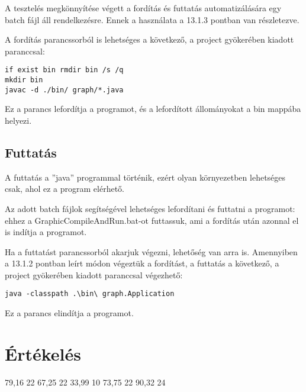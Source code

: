 A tesztelés megkönnyítése végett a fordítás és futtatás automatizálására egy batch fájl áll rendelkezésre. Ennek a használata a 13.1.3 pontban van részletezve. 

A fordítás parancssorból is lehetséges a következő, a project gyökerében kiadott paranccsal:

\begin{lstlisting}
if exist bin rmdir bin /s /q
mkdir bin
javac -d ./bin/ graph/*.java
\end{lstlisting}

Ez a parancs lefordítja a programot, és a lefordított állományokat a bin mappába helyezi.  



\subsection{Futtatás}

A futtatás a ''java'' programmal történik, ezért olyan környezetben lehetséges csak, ahol ez a program elérhető. 

Az adott batch fájlok segítségével lehetséges lefordítani és futtatni a programot: ehhez a GraphicCompileAndRun.bat-ot futtassuk, ami a fordítás után azonnal el is indítja a programot.

Ha a futtatást parancssorból akarjuk végezni, lehetőség van arra is. Amennyiben a 13.1.2 pontban leírt módon végeztük a fordítást, a futtatás a következő, a project gyökerében kiadott paranccsal végezhető:

\begin{lstlisting}
java -classpath .\bin\ graph.Application
\end{lstlisting}
Ez a parancs elindítja a programot.

\section{Értékelés}

\begin{ertekelesplusz}
{79,16} %
{22}        %
{67,25}
{22}
{33,99}
{10}
{73,75}
{22}
{90,32}
{24}

\end{ertekelesplusz}